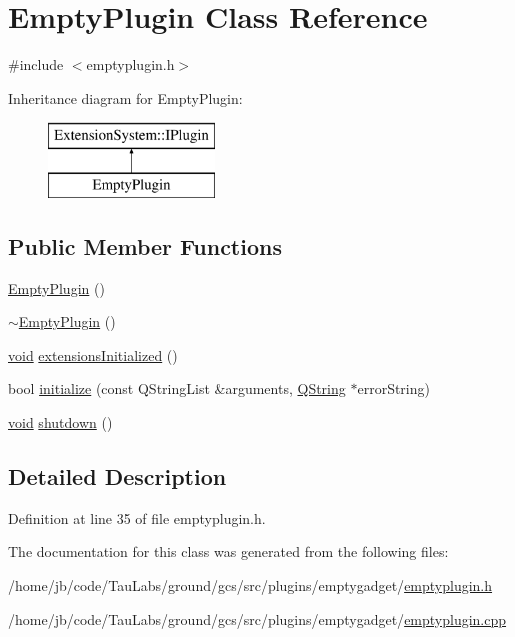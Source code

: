 \hypertarget{class_empty_plugin}{\section{\-Empty\-Plugin \-Class \-Reference}
\label{class_empty_plugin}
}


{\ttfamily \#include $<$emptyplugin.\-h$>$}

\-Inheritance diagram for \-Empty\-Plugin\-:\begin{figure}[H]
\begin{center}
\leavevmode
\includegraphics[height=2.000000cm]{class_empty_plugin}
\end{center}
\end{figure}
\subsection*{\-Public \-Member \-Functions}
\begin{DoxyCompactItemize}
\item 
\hyperlink{group___empty_gadget_plugin_ga18898df1886d72c9e78700927c8f57c6}{\-Empty\-Plugin} ()
\item 
\hyperlink{group___empty_gadget_plugin_ga0b4688809806874293c66af38d98f1ec}{$\sim$\-Empty\-Plugin} ()
\item 
\hyperlink{group___u_a_v_objects_plugin_ga444cf2ff3f0ecbe028adce838d373f5c}{void} \hyperlink{group___empty_gadget_plugin_ga492a22cdbf38d6fbb6b42e959e880d86}{extensions\-Initialized} ()
\item 
bool \hyperlink{group___empty_gadget_plugin_gafe72f3b00f1dfd2dc2acf021ab2e77b2}{initialize} (const \-Q\-String\-List \&arguments, \hyperlink{group___u_a_v_objects_plugin_gab9d252f49c333c94a72f97ce3105a32d}{\-Q\-String} $\ast$error\-String)
\item 
\hyperlink{group___u_a_v_objects_plugin_ga444cf2ff3f0ecbe028adce838d373f5c}{void} \hyperlink{group___empty_gadget_plugin_ga01fcca3c81851cf81fdb21b97632ea0a}{shutdown} ()
\end{DoxyCompactItemize}


\subsection{\-Detailed \-Description}


\-Definition at line 35 of file emptyplugin.\-h.



\-The documentation for this class was generated from the following files\-:\begin{DoxyCompactItemize}
\item 
/home/jb/code/\-Tau\-Labs/ground/gcs/src/plugins/emptygadget/\hyperlink{emptyplugin_8h}{emptyplugin.\-h}\item 
/home/jb/code/\-Tau\-Labs/ground/gcs/src/plugins/emptygadget/\hyperlink{emptyplugin_8cpp}{emptyplugin.\-cpp}\end{DoxyCompactItemize}

